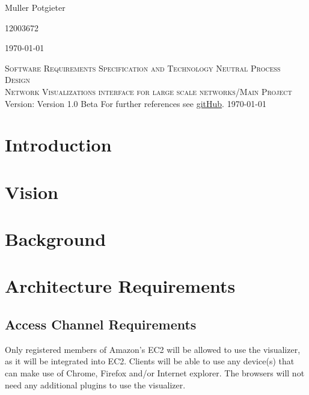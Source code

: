 \documentclass[a4paper,12pt]{report}
\begin{document}
\begin{titlepage}
\begin{center}
\begin{minipage}{0.4\textwidth}
\begin{flushleft} \large
Muller {Potgieter}
\end{flushleft}
\end{minipage}
\begin{minipage}{0.4\textwidth}
\begin{flushright} \large
\emph{}
12003672
\end{flushright}
\end{minipage}


\vfill
{\large \today}
\end{center}
\end{titlepage}
\footnotesize
%
\normalsize

\renewcommand{\thesection}{\arabic{section}}
\newpage
\begin{center}
\textsc{\LARGE Software Requirements Specification and Technology Neutral Process Design}\\[1.5cm]
\textsc{\Large Network Visualizations interface for large scale networks/Main Project}\\[0.5cm]
Version: Version 1.0 Beta
For further references see \href{ https://github.com/u13133064/NotLikeThis}{gitHub}.
\today
\end{center}
\tableofcontents{}
\newpage

\section{Introduction}

\section{Vision}

\section{Background}

\section{Architecture Requirements}
	\subsection{Access Channel Requirements}
		Only registered members of Amazon's EC2 will be allowed to use the visualizer, as it will be integrated into EC2. Clients will be able to use any device(s) that can make use of Chrome, Firefox and/or Internet explorer. The browsers will not need any additional plugins to use the visualizer.
\end{document}
